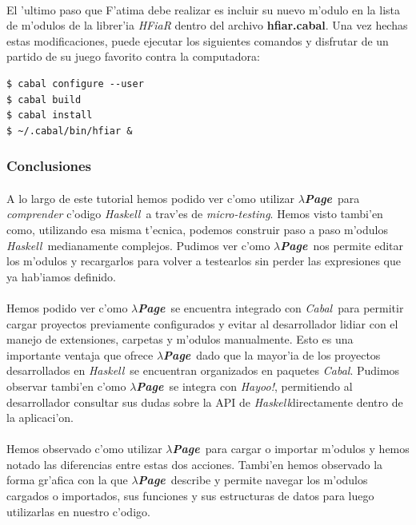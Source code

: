 \documentclass[a4paper]{article}
\newcommand{\haskell}{\textsl{Haskell}}
\newcommand{\hpage}{\textbf{\textsl{$\lambda$Page}}}
\newcommand{\cabal}{\textsl{Cabal}}
\begin{document}
\paragraph{}El 'ultimo paso que F'atima debe realizar es incluir su nuevo m'odulo en la lista de m'odulos de la librer'ia \textsl{HFiaR} dentro del archivo \textbf{hfiar.cabal}.  Una vez hechas estas modificaciones, puede ejecutar los siguientes comandos y disfrutar de un partido de su juego favorito contra la computadora:
\lstset{language=sh, frame=single, tabsize=4}
\begin{center}\begin{lstlisting}
$ cabal configure --user
$ cabal build
$ cabal install
$ ~/.cabal/bin/hfiar &
\end{lstlisting}\end{center}

\newpage
\subsubsection{Conclusiones}
\paragraph{}A lo largo de este tutorial hemos podido ver c'omo utilizar \hpage\ para \textsl{comprender} c'odigo \haskell\ a trav'es de \textsl{micro-testing}.  Hemos visto tambi'en como, utilizando esa misma t'ecnica, podemos construir paso a paso m'odulos \haskell\ medianamente complejos.  Pudimos ver c'omo \hpage\ nos permite editar los m'odulos y recargarlos para volver a testearlos sin perder las expresiones que ya hab'iamos definido.
\paragraph{}Hemos podido ver c'omo \hpage\ se encuentra integrado con \cabal\ para permitir cargar proyectos previamente configurados y evitar al desarrollador lidiar con el manejo de extensiones, carpetas y m'odulos manualmente.  Esto es una importante ventaja que ofrece \hpage\, dado que la mayor'ia de los proyectos desarrollados en \haskell\ se encuentran organizados en paquetes \cabal.  Pudimos observar tambi'en c'omo \hpage\ se integra con \textsl{Hayoo!}, permitiendo al desarrollador consultar sus dudas sobre la API de \haskell directamente dentro de la aplicaci'on.
\paragraph{}Hemos observado c'omo utilizar \hpage\ para cargar o importar m'odulos y hemos notado las diferencias entre estas dos acciones.  Tambi'en hemos observado la forma gr'afica con la que \hpage\ describe y permite navegar los m'odulos cargados o importados, sus funciones y sus estructuras de datos para luego utilizarlas en nuestro c'odigo.
\end{document}
